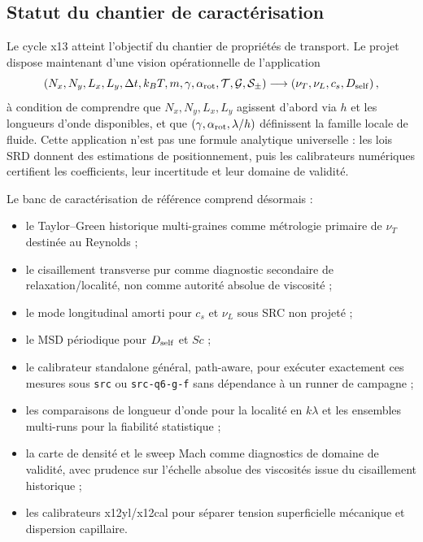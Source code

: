 \documentclass[11pt,a4paper]{article}
\begin{document}
\subsection{Statut du chantier de caractérisation}

Le cycle x13 atteint l'objectif du chantier de propriétés de transport. Le projet dispose maintenant d'une vision opérationnelle de l'application
\begin{equation}
  \left(
  N_x,N_y,L_x,L_y,\Delta t,k_BT,m,\gamma,\alpha_{\rm rot},
  \mathcal T,\mathcal G,\mathcal S_\pm
  \right)
  \longrightarrow
  \left(
  \nu_T,\nu_L,c_s,D_{\rm self}
  \right),
\end{equation}
à condition de comprendre que $N_x,N_y,L_x,L_y$ agissent d'abord via $h$ et les longueurs d'onde disponibles, et que $(\gamma,\alpha_{\rm rot},\lambda/h)$ définissent la famille locale de fluide. Cette application n'est pas une formule analytique universelle : les lois SRD donnent des estimations de positionnement, puis les calibrateurs numériques certifient les coefficients, leur incertitude et leur domaine de validité.

Le banc de caractérisation de référence comprend désormais :
\begin{itemize}[leftmargin=2em]
  \item le Taylor--Green historique multi-graines comme métrologie primaire de $\nu_T$ destinée au Reynolds ;
  \item le cisaillement transverse pur comme diagnostic secondaire de relaxation/localité, non comme autorité absolue de viscosité ;
  \item le mode longitudinal amorti pour $c_s$ et $\nu_L$ sous SRC non projeté ;
  \item le MSD périodique pour $D_{\rm self}$ et $Sc$ ;
  \item le calibrateur standalone général, path-aware, pour exécuter exactement ces mesures sous \texttt{src} ou \texttt{src-q6-g-f} sans dépendance à un runner de campagne ;
  \item les comparaisons de longueur d'onde pour la localité en $k\lambda$ et les ensembles multi-runs pour la fiabilité statistique ;
  \item la carte de densité et le sweep Mach comme diagnostics de domaine de validité, avec prudence sur l'échelle absolue des viscosités issue du cisaillement historique ;
  \item les calibrateurs x12yl/x12cal pour séparer tension superficielle mécanique et dispersion capillaire.
\end{itemize}
\end{document}
